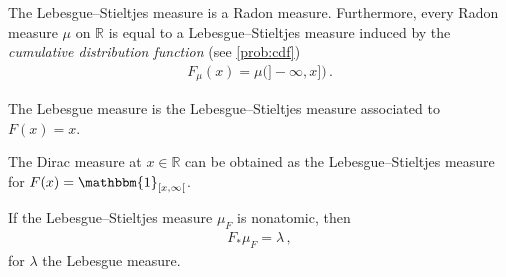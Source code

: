     \begin{property}[Regularity]
        The Lebesgue--Stieltjes measure is a Radon measure. Furthermore, every Radon measure $\mu$ on $\mathbb{R}$ is equal to a Lebesgue--Stieltjes measure induced by the \textit{cumulative distribution function} (see \cref{prob:cdf})
        \begin{gather}
            F_\mu(x) = \mu\bigl(]-\!\infty,x]\bigr)\,.
        \end{gather}
    \end{property}

    \begin{example}
        The Lebesgue measure is the Lebesgue--Stieltjes measure associated to $F(x)=x$.
    \end{example}
    \begin{example}
        The Dirac measure at $x\in\mathbb{R}$ can be obtained as the Lebesgue--Stieltjes measure for $F(x)=\mathbbm{1}_{[x,\infty[}$.
    \end{example}

    \begin{property}
        If the Lebesgue--Stieltjes measure $\mu_F$ is nonatomic, then
        \begin{gather}
            F_\ast\mu_F = \lambda\,,
        \end{gather}
        for $\lambda$ the Lebesgue measure.
    \end{property}

